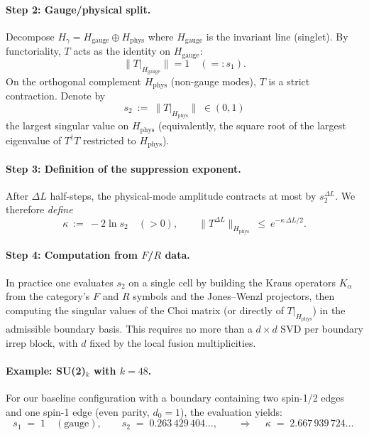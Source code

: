 \documentclass[11pt]{article}
\theoremstyle{plain}
\theoremstyle{definition}
\begin{document}
\paragraph{Step 2: Gauge/physical split.}
Decompose $H_\gamma = H_{\mathrm{gauge}} \oplus H_{\mathrm{phys}}$ where $H_{\mathrm{gauge}}$ is the invariant line (singlet). By functoriality, $T$ acts as the identity on $H_{\mathrm{gauge}}$:
\[
  \|T|_{H_{\mathrm{gauge}}}\| = 1 \quad (=:s_1).
\]
On the orthogonal complement $H_{\mathrm{phys}}$ (non-gauge modes), $T$ is a strict contraction. Denote by
\[
  s_2 \ :=\ \|T|_{H_{\mathrm{phys}}}\| \ \in (0,1)
\]
the largest singular value on $H_{\mathrm{phys}}$ (equivalently, the square root of the largest eigenvalue of $T^\dagger T$ restricted to $H_{\mathrm{phys}}$).

\paragraph{Step 3: Definition of the suppression exponent.}
After $\Delta L$ half-steps, the physical-mode amplitude contracts at most by $s_2^{\Delta L}$. We therefore \emph{define}
\begin{equation}
  \kappa \ :=\ -2\ln s_2 \quad (>0),
  \qquad
  \|T^{\Delta L}\|_{H_{\mathrm{phys}}} \ \le\ e^{-\kappa\,\Delta L/2}.
  \label{eq:kappa-definition}
\end{equation}

\paragraph{Step 4: Computation from $F$/$R$ data.}
In practice one evaluates $s_2$ on a single cell by building the Kraus operators $K_\alpha$ from the category's $F$ and $R$ symbols and the Jones--Wenzl projectors, then computing the singular values of the Choi matrix (or directly of $T|_{H_{\mathrm{phys}}}$) in the admissible boundary basis. This requires no more than a $d\times d$ SVD per boundary irrep block, with $d$ fixed by the local fusion multiplicities.

\paragraph{Example: SU(2)$_k$ with $k=48$.}
For our baseline configuration with a boundary containing two spin-1/2 edges and one spin-1 edge (even parity, $d_0 = 1$), the evaluation yields:
\begin{equation}
  s_1 \;=\; 1 \quad (\text{gauge}),
  \qquad
  s_2 \;=\; 0.263\,429\,404\ldots,
  \qquad
  \Rightarrow\quad
  \boxed{\ \kappa \;=\; 2.667\,939\,724\ldots\ }
  \label{eq:kappa-numeric}
\end{equation}
\end{document}
